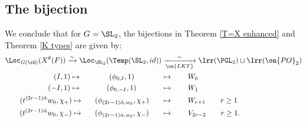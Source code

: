\documentclass[12pt]{amsart}
\theoremstyle{remark}
\begin{document}
\subsection{The bijection}
We conclude that for $G=\SL_2$, 
the bijections in Theorem \ref{T=X enhanced} 
and Theorem \ref{K types} are given by:
\begin{align*}
     \Loc_{G(\cO)}(X^\theta(F))\xrightarrow{\sim}
     \Loc_{\SL_2}(\Temp(\SL_2,id))&\xrightarrow[\on{LKT}]{\sim}\Irr(\PGL_2)\sqcup\Irr(\on{PO}_2)\\
    (I,1)\mapsto\hspace{1.3cm}(\phi_{0,I},1)\hspace{1.3cm}&\mapsto\qquad W_0\\
    (-I,1)\mapsto\hspace{1.18cm}(\phi_{0,-I},1)\hspace{1.2cm}&\mapsto\qquad W_1\\
    (t^{(2r-1)\check\alpha}w_0,\chi_+)\mapsto\hspace{0.55cm}(\phi_{(2r-1)\check\alpha,w_0},\chi_+)\hspace{0.6cm}&\mapsto \qquad W_{r+1}\qquad r\geq 1\\
    (t^{(2r-1)\check\alpha}w_0,\chi_-)\mapsto\hspace{0.55cm}(\phi_{(2r-1)\check\alpha,w_0},\chi_-)\hspace{0.6cm}&\mapsto\qquad V_{2r-2}\qquad r\geq 1.
\end{align*}
\end{document}
